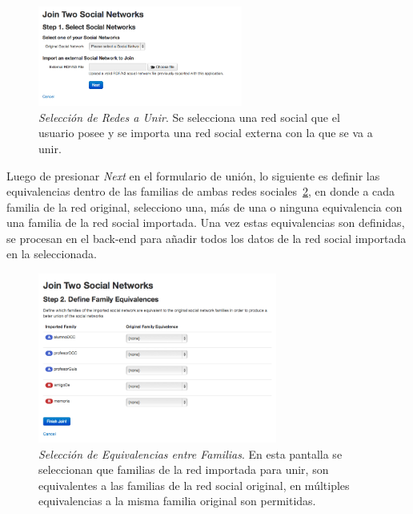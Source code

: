 \begin{figure}[H]
  \centering
  \includegraphics[width=0.6\textwidth]{images/seleccion_union.png}
  \caption[Selección de Redes a Unir]{\emph{Selección de Redes a Unir}. Se selecciona una red social que el usuario posee y se importa una red social externa con la que se va a unir.}
  \label{seleccion_union}
\end{figure}

Luego de presionar \emph{Next} en el formulario de unión, lo siguiente es definir las equivalencias dentro de las familias de ambas redes sociales~\ref{equivalencia_familias}, en donde a cada familia de la red original, selecciono una, más de una o ninguna equivalencia con una familia de la red social importada. Una vez estas equivalencias son definidas, se procesan en el back-end para añadir todos los datos de la red social importada en la seleccionada.\\

\begin{figure}[H]
  \centering
  \includegraphics[width=0.7\textwidth]{images/equivalencia_familias.png}
  \caption[Selección de Equivalencias entre Familias]{\emph{Selección de Equivalencias entre Familias}. En esta pantalla se seleccionan que familias de la red importada para unir, son equivalentes a las familias de la red social original, en múltiples equivalencias a la misma familia original son permitidas.}
  \label{equivalencia_familias}
\end{figure}

